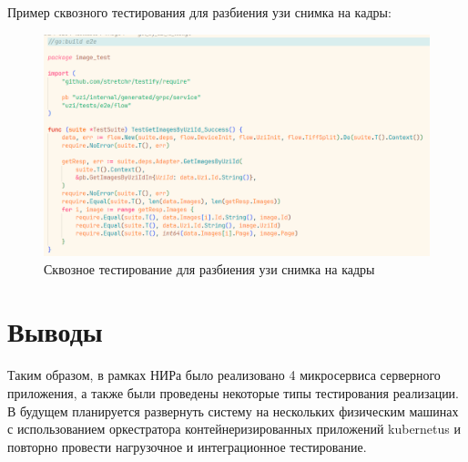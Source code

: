 Пример сквозного тестирования для разбиения узи снимка на кадры:
\begin{figure}[H]%
	\begin{center}
		\includegraphics[width=.7\columnwidth]{./img/new/e2e_test.png}%
	\end{center}
	\caption{Сквозное тестирование для разбиения узи снимка на кадры}%
	\label{pic:e2e_test}%
\end{figure}


\section{Выводы}
Таким образом, в рамках НИРа было реализовано 4 микросервиса серверного приложения, а также были проведены некоторые типы тестирования реализации. 
В будущем планируется развернуть систему на нескольких физическим машинах с использованием оркестратора контейнеризированных приложений 
kubernetus и повторно провести нагрузочное и интеграционное тестирование.




